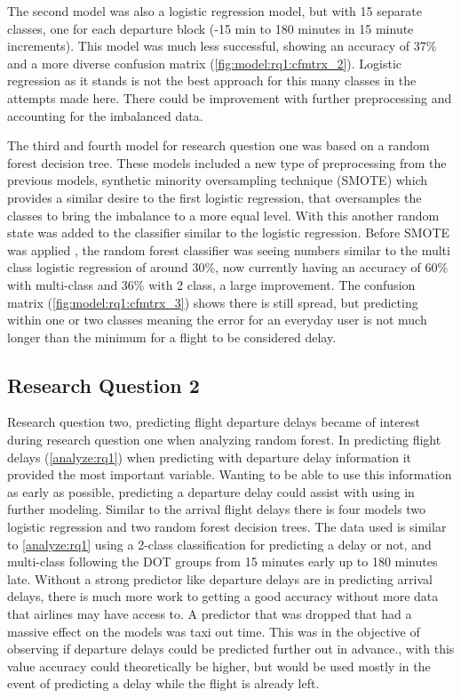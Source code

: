 \documentclass[a4paper,12pt]{article}
\begin{document}
The second model was also a logistic regression model, but with 15 separate classes, one for each departure block (-15 min to 180 minutes in 15 minute increments). This model was much less successful,
showing an accuracy of 37\% and a more diverse confusion matrix (\ref{fig:model:rq1:cfmtrx_2}). Logistic regression as it stands is not the best approach for this many classes in the attempts made here. There could be improvement with further preprocessing and accounting for the imbalanced data.

The third and fourth model for research question one was based on a random forest decision tree. These models included a new type of preprocessing from the previous models, synthetic minority oversampling technique (SMOTE) which provides 
a similar desire to the first logistic regression, that oversamples the classes to bring the imbalance to a more equal level. With this another random state was added to the classifier similar to the logistic regression.
Before SMOTE was applied , the random forest classifier was seeing numbers similar to the multi class logistic regression of around 30\%, now currently having an accuracy of 60\% with multi-class and 36\% with 2 class, a large improvement. The confusion matrix (\ref{fig:model:rq1:cfmtrx_3}) shows there is still spread,
but predicting within one or two classes meaning the error for an everyday user is not much longer than the minimum for a flight to be considered delay. 

\subsection{Research Question 2}

Research question two, predicting flight departure delays became of interest during research question one when analyzing random forest. In predicting
flight delays (\ref{analyze:rq1}) when predicting with departure delay information it provided the most important variable. Wanting to be able to use this information as early
as possible, predicting a departure delay could assist with using in further modeling. Similar to the arrival flight delays there is four models two logistic regression and two random forest decision trees.
The data used is similar to \ref{analyze:rq1} using a 2-class classification for predicting a delay or not, and multi-class following the DOT groups from 15 minutes early up to 180 minutes late. Without a strong predictor 
like departure delays are in predicting arrival delays, there is much more work to getting a good accuracy without more data that airlines may have access to. A predictor that was dropped that had a massive effect on the models was taxi out time.
This was in the objective of observing if departure delays could be predicted further out in advance., with this value accuracy could theoretically be higher, but would be used mostly in the event of predicting a delay while the flight is already left.
\end{document}
